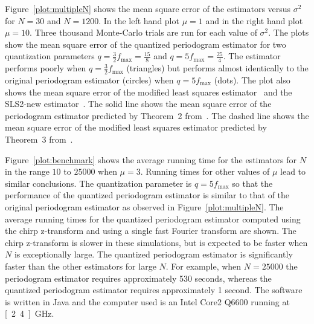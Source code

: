 \documentclass[10pt,twocolumn,twoside]{IEEEtran}
\begin{document}
Figure~\ref{plot:multipleN} shows the mean square error of the estimators versus $\sigma^2$ for $N = 30$ and $N = 1200$.  In the left hand  plot $\mu=1$ and in the right hand plot $\mu=10$.  %
Three thousand Monte-Carlo trials are run for each value of $\sigma^2$.  The plots show the mean square error of the quantized periodogram estimator for two quantization parameters $q = \tfrac{3}{2}f_{\text{max}} = \tfrac{15}{8}$ and $q = 5 f_{\text{max}} = \tfrac{25}{4}$.  The estimator performs poorly when $q = \tfrac{3}{2}f_{\text{max}}$ (triangles) but performs almost identically to the original periodogram estimator (circles) when $q = 5 f_{\text{max}}$ (dots).  The plot also shows the mean square error of the modified least squares estimator~\cite{Clarkson2007,McKilliam2007} and the SLS2-new estimator~\cite{Clarkson2007,Sidiropoulos2005}.  %
The solid line shows the mean square error of the periodogram estimator predicted by Theorem~2 from~\cite{Quinn20013asilomar_period_est}.  The dashed line shows the mean square error of the modified least squares estimator predicted by Theorem~3 from~\cite{Quinn_sparse_noisy_SSP_2012}.

Figure~\ref{plot:benchmark} shows the average running time for the estimators for $N$ in the range $10$ to $25000$ when $\mu=3$.  Running times for other values of $\mu$ lead to similar conclusions.  The quantization parameter is $q = 5 f_{\text{max}}$ so that the performance of the quantized periodogram estimator is similar to that of the original periodogram estimator as observed in Figure~\ref{plot:multipleN}.  The average running times for the quantized periodogram estimator computed using the chirp z-transform and using a single fast Fourier transform are shown.  The chirp z-transform is slower in these simulations, but is expected to be faster when $N$ is exceptionally large.  %
The quantized periodogram estimator is significantly faster than the other estimators for large $N$.  For example, when $N = 25000$ the periodogram estimator requires approximately 530 seconds, whereas the quantized periodogram estimator requires approximately 1 second.  The software is written in Java and the computer used is an Intel Core2 Q6600 running at \unit[2.4]{GHz}. 
\end{document}
